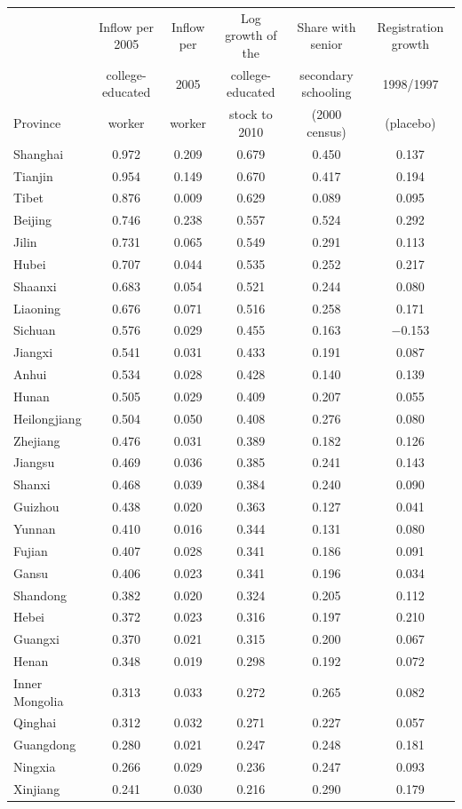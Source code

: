 \begin{tabular}{@{}lccccc@{}}
\toprule
 & Inflow per 2005 & Inflow per & Log growth of the & Share with senior & Registration growth \\
 & college-educated & 2005 & college-educated & secondary schooling & 1998/1997 \\
Province & worker & worker & stock to 2010 & (2000 census) & (placebo) \\
\midrule
Shanghai & 0.972 & 0.209 & 0.679 & 0.450 & 0.137 \\
Tianjin & 0.954 & 0.149 & 0.670 & 0.417 & 0.194 \\
Tibet & 0.876 & 0.009 & 0.629 & 0.089 & 0.095 \\
Beijing & 0.746 & 0.238 & 0.557 & 0.524 & 0.292 \\
Jilin & 0.731 & 0.065 & 0.549 & 0.291 & 0.113 \\
Hubei & 0.707 & 0.044 & 0.535 & 0.252 & 0.217 \\
Shaanxi & 0.683 & 0.054 & 0.521 & 0.244 & 0.080 \\
Liaoning & 0.676 & 0.071 & 0.516 & 0.258 & 0.171 \\
Sichuan & 0.576 & 0.029 & 0.455 & 0.163 & $-$0.153 \\
Jiangxi & 0.541 & 0.031 & 0.433 & 0.191 & 0.087 \\
Anhui & 0.534 & 0.028 & 0.428 & 0.140 & 0.139 \\
Hunan & 0.505 & 0.029 & 0.409 & 0.207 & 0.055 \\
Heilongjiang & 0.504 & 0.050 & 0.408 & 0.276 & 0.080 \\
Zhejiang & 0.476 & 0.031 & 0.389 & 0.182 & 0.126 \\
Jiangsu & 0.469 & 0.036 & 0.385 & 0.241 & 0.143 \\
Shanxi & 0.468 & 0.039 & 0.384 & 0.240 & 0.090 \\
Guizhou & 0.438 & 0.020 & 0.363 & 0.127 & 0.041 \\
Yunnan & 0.410 & 0.016 & 0.344 & 0.131 & 0.080 \\
Fujian & 0.407 & 0.028 & 0.341 & 0.186 & 0.091 \\
Gansu & 0.406 & 0.023 & 0.341 & 0.196 & 0.034 \\
Shandong & 0.382 & 0.020 & 0.324 & 0.205 & 0.112 \\
Hebei & 0.372 & 0.023 & 0.316 & 0.197 & 0.210 \\
Guangxi & 0.370 & 0.021 & 0.315 & 0.200 & 0.067 \\
Henan & 0.348 & 0.019 & 0.298 & 0.192 & 0.072 \\
Inner Mongolia & 0.313 & 0.033 & 0.272 & 0.265 & 0.082 \\
Qinghai & 0.312 & 0.032 & 0.271 & 0.227 & 0.057 \\
Guangdong & 0.280 & 0.021 & 0.247 & 0.248 & 0.181 \\
Ningxia & 0.266 & 0.029 & 0.236 & 0.247 & 0.093 \\
Xinjiang & 0.241 & 0.030 & 0.216 & 0.290 & 0.179 \\
\bottomrule
\end{tabular}
